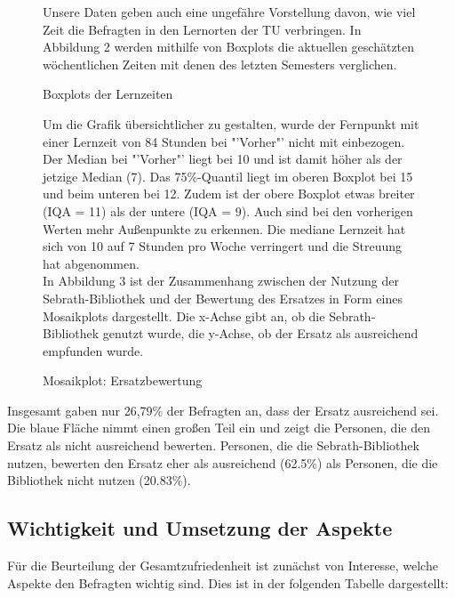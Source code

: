 \documentclass[11pt, a4paper]{article}
\begin{document}
\begin{figure}[htp]
	Unsere Daten geben auch eine ungefähre Vorstellung davon, wie viel Zeit die Befragten in den Lernorten der TU verbringen.
	In Abbildung 2 werden mithilfe von Boxplots die aktuellen geschätzten wöchentlichen Zeiten mit denen des letzten Semesters verglichen. \\
	\vspace{-1.5cm}
	\hspace{-0.8cm}
	{\centering} 
	\vspace{0cm}
	\caption{Boxplots der Lernzeiten}
	\vspace{0.7cm}
Um die Grafik übersichtlicher zu gestalten, wurde der Fernpunkt mit einer Lernzeit von 84 Stunden bei "'Vorher"' nicht mit einbezogen.
Der Median bei "'Vorher"' liegt bei 10 und ist damit höher als der jetzige Median (7).
Das 75\%-Quantil liegt im oberen Boxplot bei 15 und beim unteren bei 12.
Zudem ist der obere Boxplot etwas breiter (IQA = 11) als der untere (IQA = 9).
Auch sind bei den vorherigen Werten mehr Außenpunkte zu erkennen.
Die mediane Lernzeit hat sich von 10 auf 7 Stunden pro Woche verringert und die Streuung hat abgenommen.\\

In Abbildung 3 ist der Zusammenhang zwischen der Nutzung der Sebrath-Bibliothek  und der Bewertung des Ersatzes in Form eines Mosaikplots dargestellt. Die x-Achse gibt an, ob die Sebrath-Bibliothek genutzt wurde, die y-Achse, ob der Ersatz als ausreichend empfunden wurde. 
	
	\vspace{0.07cm}
	 \begin{center}
	{\centering } \end{center}
	\vspace{-1.5cm}
	\caption{Mosaikplot: Ersatzbewertung}
\end{figure}


\newpage
Insgesamt gaben nur 26,79\% der Befragten an, dass der Ersatz ausreichend sei. Die blaue Fläche nimmt einen großen Teil ein und zeigt die Personen, die den Ersatz als nicht ausreichend bewerten. Personen, die die Sebrath-Bibliothek nutzen, bewerten den Ersatz eher als ausreichend (62.5\%) als Personen, die die Bibliothek nicht nutzen (20.83\%).

\subsection{Wichtigkeit und Umsetzung der Aspekte}
Für die Beurteilung der Gesamtzufriedenheit ist zunächst von Interesse, welche Aspekte den Befragten wichtig sind. Dies ist in der folgenden Tabelle dargestellt:
\end{document}
